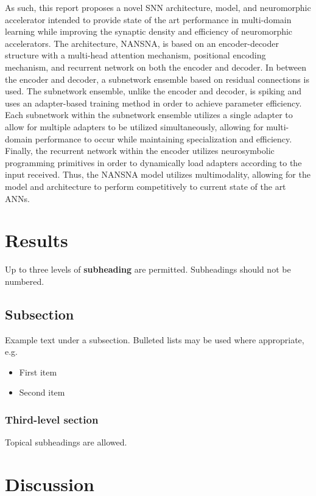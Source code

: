 \documentclass[fleqn,10pt]{wlscirep}
\begin{document}
As such, this report proposes a novel SNN architecture, model, and neuromorphic accelerator intended to provide state of the art performance in multi-domain learning while improving the synaptic density and efficiency of neuromorphic accelerators. The architecture, NANSNA, is based on an encoder-decoder structure with a multi-head attention mechanism, positional encoding mechanism, and recurrent network on both the encoder and decoder. In between the encoder and decoder, a subnetwork ensemble based on residual connections is used. The subnetwork ensemble, unlike the encoder and decoder, is spiking and uses an adapter-based training method in order to achieve parameter efficiency. Each subnetwork within the subnetwork ensemble utilizes a single adapter to allow for multiple adapters to be utilized simultaneously, allowing for multi-domain performance to occur while maintaining specialization and efficiency. Finally, the recurrent network within the encoder utilizes neurosymbolic programming primitives in order to dynamically load adapters according to the input received. Thus, the NANSNA model utilizes multimodality, allowing for the model and architecture to perform competitively to current state of the art ANNs.

\section*{Results}

Up to three levels of \textbf{subheading} are permitted. Subheadings should not be numbered.

\subsection*{Subsection}

Example text under a subsection. Bulleted lists may be used where appropriate, e.g.

\begin{itemize}
\item First item
\item Second item
\end{itemize}

\subsubsection*{Third-level section}
 
Topical subheadings are allowed.

\section*{Discussion}
\end{document}
